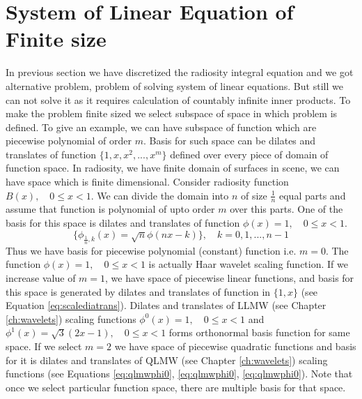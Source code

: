 \section{System of Linear Equation of Finite size }
In previous section we have discretized the radiosity integral equation and we got alternative problem, problem of solving system of linear equations. But  still we can not solve it as it requires calculation    of countably infinite inner products. To make the problem finite sized we select subspace of space in which problem is defined. To give an example, we can have subspace of function which are piecewise polynomial of order $m$. Basis for such space can be dilates and translates of function $\{1,x,x^2,...,x^m\}$ defined over every piece of domain of function space. In radiosity, we have finite domain of surfaces in scene, we can have space which is finite dimensional. Consider radiosity function $B(x), \quad 0 \leq x < 1$. We can divide the domain into $n$ of size $\frac{1}{n}$ equal parts and assume that function is polynomial of upto order $m$ over this parts. One of the basis for this space is dilates and translates of function $\phi(x)=1, \quad 0 \leq x < 1$. 
\begin{equation}\label{eq:scalediatrans}
    \{\phi_{\frac{1}{n},k}(x)=\sqrt{n}\phi(nx-k)\},\quad k=0,1,...,n-1
\end{equation} 
Thus we have basis for piecewise polynomial (constant) function i.e. $m=0$. The function $\phi(x)=1, \quad 0 \leq x < 1$ is actually Haar wavelet scaling function. If we increase value of $m = 1$, we have space of piecewise linear functions, and basis for this space is generated by dilates and translates of function in $\{1,x\}$  (see Equation \ref{eq:scalediatrans}). Dilates and translates of LLMW (see Chapter \ref{ch:wavelets}) scaling functions $\phi^0(x)=1, \quad 0 \leq x < 1$ and $\phi^1(x)=\sqrt{3}(2x-1), \quad 0 \leq x < 1$ forms orthonormal basis function for same space.  If we select $m= 2$ we have space of piecewise quadratic functions and basis for it is dilates and translates of QLMW (see Chapter \ref{ch:wavelets}) scaling functions (see Equations \ref{eq:qlmwphi0}, \ref{eq:qlmwphi0}, \ref{eq:qlmwphi0}). Note that once we select particular function space, there are multiple basis for that space.

